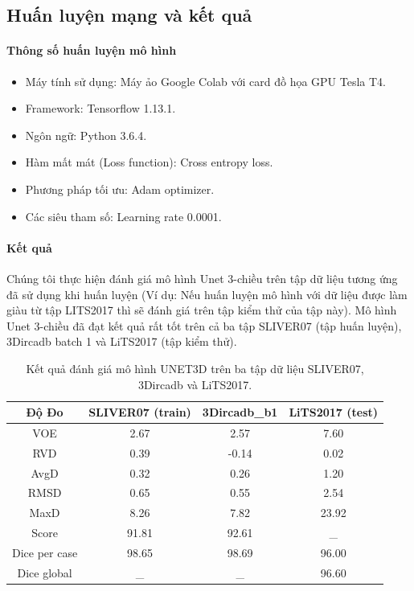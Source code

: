 \subsection{Huấn luyện mạng và kết quả}
\paragraph{Thông số huấn luyện mô hình}
\begin{itemize}
\item Máy tính sử dụng: Máy ảo Google Colab với card đồ họa GPU Tesla T4.
\item Framework: Tensorflow 1.13.1.
\item Ngôn ngữ: Python 3.6.4.
\item Hàm mất mát (Loss function): Cross entropy loss.
\item Phương pháp tối ưu: Adam optimizer.
\item Các siêu tham số: Learning rate 0.0001.
\end{itemize}
\paragraph{Kết quả}
Chúng tôi thực hiện đánh giá mô hình Unet 3-chiều trên tập dữ liệu tương ứng đã sử dụng khi huấn luyện (Ví dụ: Nếu huấn luyện mô hình với dữ liệu được làm giàu từ tập LITS2017 thì sẽ đánh giá trên tập kiểm thử của tập này). Mô hình Unet 3-chiều đã đạt kết quả rất tốt trên cả ba tập SLIVER07 (tập huấn luyện), 3Dircadb batch 1 và LiTS2017 (tập kiểm thử).
\begin{table}[]
\begin{tabular}{|c|c|c|c|}
\hline
\textbf{Độ Đo} & \textbf{SLIVER07 (train)} & \textbf{3Dircadb\_b1} & \textbf{LiTS2017 (test)} \\ \hline
VOE            & 2.67                      & 2.57                  & 7.60                     \\ \hline
RVD            & 0.39                      & -0.14                 & 0.02                     \\ \hline
AvgD           & 0.32                      & 0.26                  & 1.20                     \\ \hline
RMSD           & 0.65                      & 0.55                  & 2.54                     \\ \hline
MaxD           & 8.26                      & 7.82                  & 23.92                    \\ \hline
Score          & 91.81                     & 92.61                 & \_                       \\ \hline
Dice per case  & 98.65                     & 98.69                 & 96.00                    \\ \hline
Dice global    & \_                        & \_                    & 96.60                     \\ \hline
\end{tabular}
\caption{\label{tab:CNN-SLIVER07_Test}Kết quả đánh giá mô hình UNET3D trên ba tập dữ liệu SLIVER07, 3Dircadb và LiTS2017.}
\end{table}



